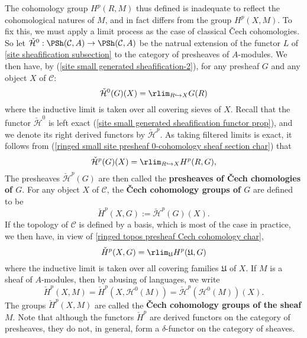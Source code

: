 The cohomology group $H^p(R,M)$ thus defined is inadequate to reflect the cohomological natures of $M$, and in fact differs from the group $H^p(X,M)$. To fix this, we must apply a limit process as the case of classical \v{C}ech cohomologies. So let $\check{\mathcal{H}}^0:\PSh(\mathcal{C},A)\to \PSh(\mathcal{C},A)$ be the natrual extension of the functor $L$ of \autoref{site sheafification subsection} to the category of presheaves of $A$-modules. We then have, by (\ref{site small generated sheafification-2}), for any presheaf $G$ and any object $X$ of $\mathcal{C}$:
\begin{equation}\label{ringed small site presheaf 0-cohomology sheaf section char}
\check{\mathcal{H}}^0(G)(X)=\rlim_{R\hookrightarrow X}G(R)
\end{equation}
where the inductive limit is taken over all covering sieves of $X$. Recall that the functor $\check{\mathcal{H}}^0$ is left exact (\cref{site small generated sheafification functor prop}), and we denote its right derived functors by $\check{\mathcal{H}}^p$. As taking filtered limits is exact, it follows from (\ref{ringed small site presheaf 0-cohomology sheaf section char}) that
\begin{equation}\label{ringed small site presheaf p-cohomology sheaf section char}
\check{\mathcal{H}}^p(G)(X)=\rlim_{R\hookrightarrow X}H^p(R,G),
\end{equation}
The presheaves $\check{\mathcal{H}}^p(G)$ are then called the \textbf{presheaves of \v{C}ech chomologies of $G$}. For any object $X$ of $\mathcal{C}$, the \textbf{\v{C}ech cohomology groups of $G$} are defined to be
\begin{equation}\label{ringed small site presheaf Cech cohomology group def}
\check{H}^p(X,G):=\check{\mathcal{H}}^p(G)(X).
\end{equation}
If the topology of $\mathcal{C}$ is defined by a basis, which is most of the case in practice, we then have, in view of \cref{ringed topos presheaf Cech cohomology char},
\begin{equation}\label{ringed small site presheaf Cech p-cohomology sheaf section char}
\check{H}^p(X,G)=\rlim_\mathfrak{U}H^p(\mathfrak{U},G)
\end{equation}
where the inductive limit is taken over all covering families $\mathfrak{U}$ of $X$. If $M$ is a sheaf of $A$-modules, then by abusing of languages, we write
\begin{equation}\label{ringed small site sheaf Cech cohomology group def}
\check{H}^p(X,M)=\check{H}^p(X,\mathcal{H}^0(M))=\check{\mathcal{H}}^p(\mathcal{H}^0(M))(X).
\end{equation}
The groups $\check{H}^p(X,M)$ are called the \textbf{\v{C}ech cohomology groups of the sheaf $M$}. Note that although the functors $\check{H}^p$ are derived functors on the category of presheaves, they do not, in general, form a $\delta$-functor on the category of sheaves.
